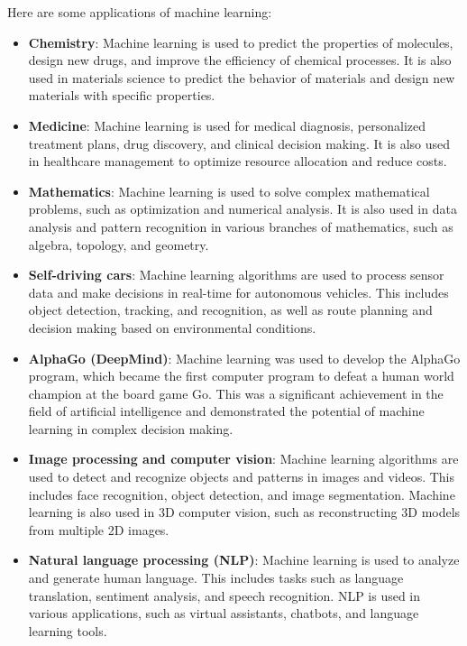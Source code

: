\documentclass{article}
\begin{document}
\noindent Here are some applications of machine learning:
\begin{itemize}
    \item \textbf{Chemistry}: Machine learning is used to predict the properties of molecules, design new drugs, and improve the efficiency of chemical processes. It is also used in materials science to predict the behavior of materials and design new materials with specific properties.
    
    \item \textbf{Medicine}: Machine learning is used for medical diagnosis, personalized treatment plans, drug discovery, and clinical decision making. It is also used in healthcare management to optimize resource allocation and reduce costs.

    \item \textbf{Mathematics}: Machine learning is used to solve complex mathematical problems, such as optimization and numerical analysis. It is also used in data analysis and pattern recognition in various branches of mathematics, such as algebra, topology, and geometry.
    
    \item \textbf{Self-driving cars}: Machine learning algorithms are used to process sensor data and make decisions in real-time for autonomous vehicles. This includes object detection, tracking, and recognition, as well as route planning and decision making based on environmental conditions.
    
    \item \textbf{AlphaGo (DeepMind)}: Machine learning was used to develop the AlphaGo program, which became the first computer program to defeat a human world champion at the board game Go. This was a significant achievement in the field of artificial intelligence and demonstrated the potential of machine learning in complex decision making.
    
    \item \textbf{Image processing and computer vision}: Machine learning algorithms are used to detect and recognize objects and patterns in images and videos. This includes face recognition, object detection, and image segmentation. Machine learning is also used in 3D computer vision, such as reconstructing 3D models from multiple 2D images.
    
    \item \textbf{Natural language processing (NLP)}: Machine learning is used to analyze and generate human language. This includes tasks such as language translation, sentiment analysis, and speech recognition. NLP is used in various applications, such as virtual assistants, chatbots, and language learning tools.
    

\end{itemize}
\end{document}
